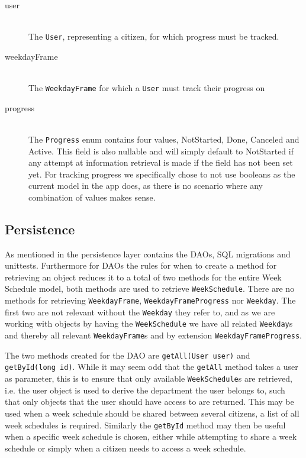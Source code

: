 \begin{description}
    \item [user] \hfill \\
    The \texttt{User}, representing a citizen, for which progress must be tracked.
    \item [weekdayFrame] \hfill \\
    The \texttt{WeekdayFrame} for which a \texttt{User} must track their progress on
    \item [progress] \hfill \\
    The \texttt{Progress} enum contains four values, NotStarted, Done, Canceled and Active.
    This field is also nullable and will simply default to NotStarted if any attempt at information retrieval is made if the field has not been set yet.
    For tracking progress we specifically chose to not use booleans as the current model in the app does, as there is no scenario where any combination of values makes sense.
\end{description}

\subsection{Persistence}
As mentioned in  the persistence layer contains the DAOs, SQL migrations and unittests.%
Furthermore for DAOs the rules for when to create a method for retrieving an object reduces it to a total of two methods for the entire Week Schedule model, both methods are used to retrieve \texttt{WeekSchedule}.
There are no methods for retrieving \texttt{WeekdayFrame}, \texttt{WeekdayFrameProgress} nor \texttt{Weekday}.
The first two are not relevant without the \texttt{Weekday} they refer to, and as we are working with objects by having the \texttt{WeekSchedule} we have all related \texttt{Weekday}s and thereby all relevant \texttt{WeekdayFrame}s and by extension \texttt{WeekdayFrameProgress}.

The two methods created for the DAO are \texttt{getAll(User user)} and \texttt{getById(long id)}.
While it may seem odd that the \texttt{getAll} method takes a user as parameter, this is to ensure that only available \texttt{WeekSchedule}s are retrieved, i.e. the user object is used to derive the department the user belongs to, such that only objects that the user should have access to are returned.
This may be used when a week schedule should be shared between several citizens, a list of all week schedules is required.
Similarly the \texttt{getById} method may then be useful when a specific week schedule is chosen, either while attempting to share a week schedule or simply when a citizen needs to access a week schedule.

